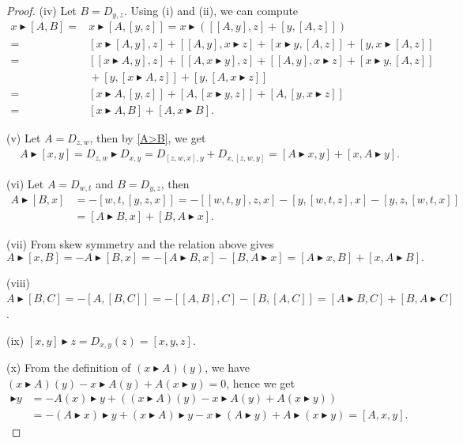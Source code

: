 \documentclass[pdftex]{sigma}
\numberwithin{equation}{section}
\begin{document}
\begin{proof}
(iv) Let $B=D_{y,z}$. Using (i) and (ii), we can compute
 \begin{align*}
 x \blacktriangleright [A,B] ={}& x \blacktriangleright [A,[y,z]] = x \blacktriangleright ([[A,y],z] + [y,[A,z]] ) \\
 ={}& [x \blacktriangleright [A,y],z] + [[A,y], x \blacktriangleright z] +[x \blacktriangleright y, [A,z]] + [y, x \blacktriangleright [A,z]] \\
 ={}& [[x \blacktriangleright A, y],z] + [[A,x\blacktriangleright y],z] + [[A,y],x \blacktriangleright z] + [x \blacktriangleright y, [A,z]] \\
 &{}+ [y,[x\blacktriangleright A, z]] + [y,[A,x\blacktriangleright z]] \\
 ={}& [x\blacktriangleright A, [y,z]] + [A,[x\blacktriangleright y,z]] + [A,[y,x\blacktriangleright z]] \\
 ={}& [x\blacktriangleright A,B] + [A, x\blacktriangleright B].
 \end{align*}

(v) Let $A= D_{z,w}$, then by \eqref{A>B}, we get
 \begin{align*}
& A \blacktriangleright [x,y] = D_{z,w} \blacktriangleright D_{x,y}
 = D_{[z,w,x],y} + D_{x,[z,w,y]}
 = [A \blacktriangleright x, y] + [x, A \blacktriangleright y].
 \end{align*}

(vi) Let $A = D_{w,t}$ and $B = D_{y,z}$, then
 \begin{align*}
 A\blacktriangleright [B,x] & = - [w,t ,[y,z,x]]
 = -[[w,t,y],z,x] - [y,[w,t,z],x] - [y,z,[w,t,x]] \\
 & = [A \blacktriangleright B,x] + [B, A\blacktriangleright x].
 \end{align*}

(vii) From skew symmetry and the relation above gives \[
 A \blacktriangleright [x,B] = -A \blacktriangleright [B,x] = -[A \blacktriangleright B,x] - [B, A\blacktriangleright x] = [A \blacktriangleright x,B] + [x, A \blacktriangleright B].
 \]

(viii) $ A \blacktriangleright [B,C] = -[A,[B,C]] = -[[A,B],C] - [B,[A,C]] = [A\blacktriangleright B,C] + [B, A\blacktriangleright C]$.

(ix) $[x,y]\blacktriangleright z = D_{x,y} (z) = [x,y,z]$.

(x) From the definition of $(x \blacktriangleright A)(y)$, we have $(x \blacktriangleright A)(y) - x \blacktriangleright A(y) + A(x\blacktriangleright y) = 0$, hence we get
 \begin{align*}
 [A,x] \blacktriangleright y & = -A(x) \blacktriangleright y + ( (x \blacktriangleright A)(y) - x \blacktriangleright A(y) + A(x\blacktriangleright y) ) \\
 & = - (A\blacktriangleright x) \blacktriangleright y + (x \blacktriangleright A) \blacktriangleright y - x \blacktriangleright ( A \blacktriangleright y) + A \blacktriangleright (x \blacktriangleright y)
 = [A,x,y].
 \end{align*}


\end{proof}
\end{document}
